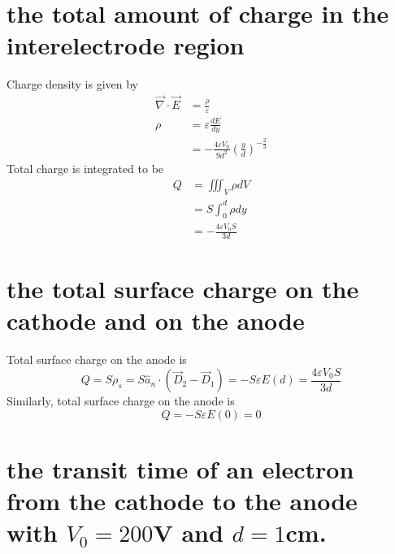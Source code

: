 \documentclass[answers]{exam}
\begin{document}
\begin{questions}
\begin{parts}
    \part{the total amount of charge in the interelectrode region}

    \begin{solution}
        Charge density is given by
        \begin{align*}
            \vec\nabla \cdot \vec E &= \frac{\rho}{\varepsilon} \\
            \rho &= \varepsilon \frac{dE}{dy} \\
                 &= -\frac{4\varepsilon V_0}{9d^2}\left(\frac{y}{d}\right)^{-\frac{2}{3}}
        \end{align*}
        Total charge is integrated to be
        \begin{align*}
            Q &= \iiint_V \rho dV \\
              &= S\int_0^d \rho dy \\
              &= -\frac{4\varepsilon V_0S}{3d}
        \end{align*}
    \end{solution}

    \part{the total surface charge on the cathode and on the anode}

    \begin{solution}
        Total surface charge on the anode is
        $$Q = S\rho_s = S\hat a_n \cdot (\vec D_2 - \vec D_1) = -S\varepsilon E(d) = \frac{4\varepsilon V_0S}{3d}$$
        Similarly, total surface charge on the anode is
        $$Q = -S\varepsilon E(0) = 0$$
    \end{solution}

    \part{the transit time of an electron from the cathode to the anode with $V_0 = 200$V and $d = 1$cm.}


\end{parts}
\end{questions}
\end{document}
